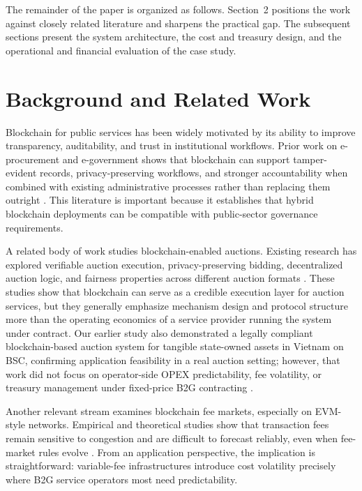 \documentclass[runningheads]{llncs}
\begin{document}
The remainder of the paper is organized as follows. Section~2 positions the work against closely related literature and sharpens the practical gap. The subsequent sections present the system architecture, the cost and treasury design, and the operational and financial evaluation of the case study.

\section{Background and Related Work}

Blockchain for public services has been widely motivated by its ability to improve transparency, auditability, and trust in institutional workflows. Prior work on e-procurement and e-government shows that blockchain can support tamper-evident records, privacy-preserving workflows, and stronger accountability when combined with existing administrative processes rather than replacing them outright \cite{ref_Akaba2020,ref_Baranwal2020,ref_abdelsalam2025}. This literature is important because it establishes that hybrid blockchain deployments can be compatible with public-sector governance requirements.

A related body of work studies blockchain-enabled auctions. Existing research has
explored verifiable auction execution, privacy-preserving bidding,
decentralized auction logic, and fairness properties across different auction
formats \cite{ref_Shi2023,ref_chiquito2023}. These studies show that
blockchain can serve as a credible execution layer for auction services, but
they generally emphasize mechanism design and protocol structure more than the
operating economics of a service provider running the system under contract.
Our earlier study also demonstrated a legally compliant blockchain-based auction
system for tangible state-owned assets in Vietnam on BSC, confirming
application feasibility in a real auction setting; however, that work did not
focus on operator-side OPEX predictability, fee volatility, or treasury
management under fixed-price B2G contracting \cite{ref_Le2026DAS}.

Another relevant stream examines blockchain fee markets, especially on EVM-style networks. Empirical and theoretical studies show that transaction fees remain sensitive to congestion and are difficult to forecast reliably, even when fee-market rules evolve \cite{roughgarden2021,reijsbergen2021,liu2022}. From an application perspective, the implication is straightforward: variable-fee infrastructures introduce cost volatility precisely where B2G service operators most need predictability.
\end{document}
